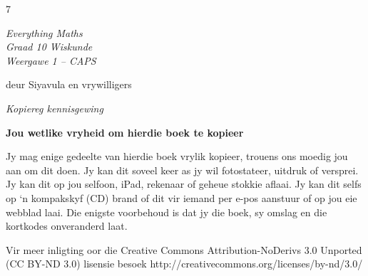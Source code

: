 7



\begin{titlepage}
\begin{adjustwidth}{1in}{1in}
\begin{center}
    \thispagestyle{empty}

    \vspace*{4in}

    {\normalfont\sffamily\fontsize{36}\normalfont\itshape{Everything Maths } \\ \vspace*{1cm}
    {\normalfont\sffamily\fontsize{22}\normalfont\itshape{Graad 10 Wiskunde}}
    \vspace*{1in} \\
    \LARGE Weergawe 1 -- CAPS  \\

   {\vspace*{2in}
     deur Siyavula en vrywilligers 
  

\vfill

    }}
\end{center}
\end{adjustwidth}
\end{titlepage}






\newpage
\thispagestyle{empty}
{
\begin{center}
\normalfont\sffamily\fontsize{22}\normalfont\itshape  Kopiereg kennisgewing\\

\vspace*{1in}

\textbf{Jou wetlike vryheid om hierdie boek te kopieer}\\

\end{center}
}

{\large
Jy mag enige gedeelte van hierdie boek vrylik kopieer, trouens ons moedig jou aan om dit doen. Jy kan dit soveel keer as jy wil fotostateer, uitdruk of versprei. Jy kan dit op jou selfoon, iPad, rekenaar of geheue stokkie aflaai. Jy kan dit selfs op ‘n kompakskyf (CD) brand of dit vir iemand per e-pos aanstuur of op jou eie webblad laai.
Die enigste voorbehoud is dat jy die boek, sy omslag en die kortkodes onveranderd laat. \par

Vir meer inligting oor die Creative Commons Attribution-NoDerivs 3.0 Unported (CC BY-ND
3.0) lisensie besoek http://creativecommons.org/licenses/by-nd/3.0/}\\


